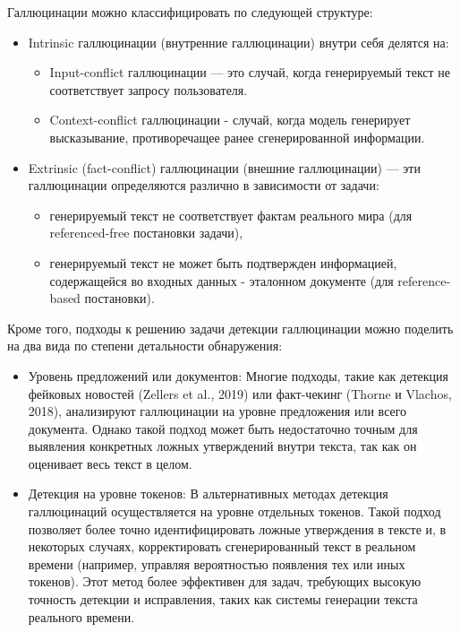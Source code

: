 \documentclass[12pt]{article}
\begin{document}
Галлюцинации можно классифицировать по следующей структуре:
    \begin{itemize}
        \item Intrinsic галлюцинации (внутренние галлюцинации) внутри себя делятся на:
        \begin{itemize}
            \item Input-conflict галлюцинации
        — это случай, когда генерируемый текст не соответствует запросу пользователя. 
            \item Context-conflict галлюцинации - случай, когда модель генерирует высказывание, противоречащее ранее сгенерированной информации.
        \end{itemize}
        
        \item Extrinsic (fact-conflict) галлюцинации (внешние галлюцинации) — эти галлюцинации определяются различно в зависимости от задачи:
            \begin{itemize}
                \item генерируемый текст не соответствует фактам реального мира (для referenced-free постановки задачи),
                \item генерируемый текст не может быть подтвержден информацией, содержащейся во входных данных - эталонном документе (для reference-based постановки).
            \end{itemize}
    \end{itemize}

Кроме того, подходы к решению задачи детекции галлюцинации можно поделить на два вида по степени детальности обнаружения:
\begin{itemize}
   \item Уровень предложений или документов: Многие подходы, такие как детекция фейковых новостей (Zellers et al., 2019) или факт-чекинг (Thorne и Vlachos, 2018), анализируют галлюцинации на уровне предложения или всего документа. Однако такой подход может быть недостаточно точным для выявления конкретных ложных утверждений внутри текста, так как он оценивает весь текст в целом.
   \item Детекция на уровне токенов: В альтернативных методах детекция галлюцинаций осуществляется на уровне отдельных токенов. Такой подход позволяет более точно идентифицировать ложные утверждения в тексте и, в некоторых случаях, корректировать сгенерированный текст в реальном времени (например, управляя вероятностью появления тех или иных токенов). Этот метод более эффективен для задач, требующих высокую точность детекции и исправления, таких как системы генерации текста реального времени.
\end{itemize}
\end{document}
